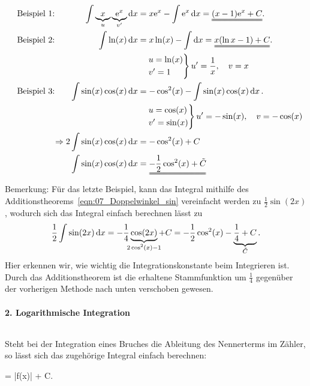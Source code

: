 \begin{alignat}{3}
    &\qq{Beispiel 1:}& \int \underbrace{x}_{u} \underbrace{\e^{x}}_{v'} \dd{x}  &= x \e^x - \int \e^x \dd{x} = \uuline{(x-1) \e^x + C}.\\
    &\qq{Beispiel 2:}& \int \ln(x) \dd{x} &= x \ln(x) - \int \dd{x} = \uuline{x(\ln x -1) + C}. \\
    & &&\quad\begin{rcases}
        u = \ln(x) \\ v' = 1 
    \end{rcases} u' = \frac{1}{x}, \quad v= x \notag \\
    &\qq{Beispiel 3:}& \int \sin(x)\cos(x) \dd{x} &= -\cos^2(x) - \int \sin(x) \cos(x) \dd{x}. \notag \\
    & &&\quad \begin{rcases}
        u = \cos(x) \\ v' = \sin(x) 
    \end{rcases} u' = -\sin(x), \quad v= -\cos(x) \notag \\
    & &\hspace{-1cm}\Rightarrow 2 \int \sin(x) \cos(x) \dd{x} &= -\cos^2(x) + C \notag \\
    & &            \int \sin(x) \cos(x) \dd{x} &= \uuline{-\frac{1}{2}\cos^2(x) + \tilde{C}}
\end{alignat}
Bemerkung: Für das letzte Beispiel, kann das Integral mithilfe des Additionstheorems~\eqref{eqn:07_Doppelwinkel_sin} vereinfacht werden zu $\frac{1}{2}\sin(2x)$, wodurch sich das Integral einfach berechnen lässt zu 
\begin{align}
    \frac{1}{2}\int \sin(2x) \dd{x} = -\frac{1}{4} \underbrace{\cos(2x)}_{\mathclap{2 \cos^2(x) -1}} + C  = -\frac{1}{2} \cos^2(x) - \underbrace{\frac{1}{4} + C}_{\tilde{C}}.
\end{align}
Hier erkennen wir, wie wichtig die Integrationskonstante beim Integrieren ist. Durch das Additionstheorem ist die erhaltene Stammfunktion um $\frac{1}{4}$ gegenüber der vorherigen Methode nach unten verschoben gewesen.

\paragraph{2. Logarithmische Integration}$~$

Steht bei der Integration eines Bruches die Ableitung des Nennerterms im Zähler, so lässt sich das zugehörige Integral einfach berechnen: 
\begin{mymathbox}[ams align, title={Logarithmische Integration}, colframe={FSUblau}]
    \int {}  = \ln|f(x)| + C.
\end{mymathbox}


